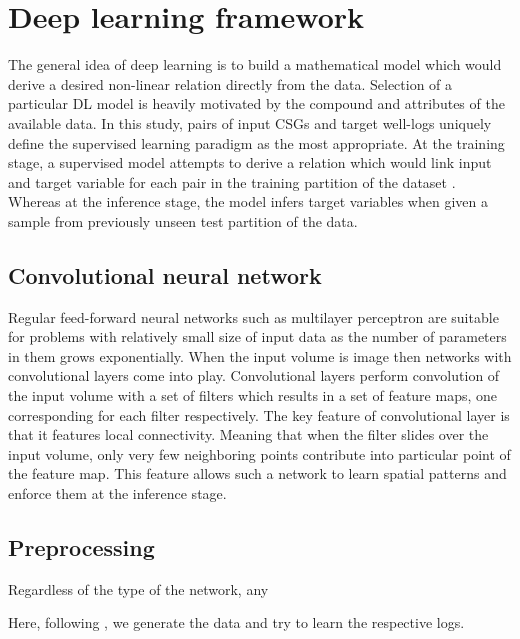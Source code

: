 \documentclass[manuscript]{geophysics}
\begin{document}
\section{Deep learning framework}
The general idea of deep learning is to build a mathematical model which would derive a desired non-linear relation directly from the data. Selection of a particular DL model is heavily motivated by the compound and attributes of the available data. 
In this study,  pairs of input CSGs and target well-logs  uniquely define the supervised learning paradigm as the most appropriate. At the training stage, a supervised model attempts to derive a relation which would link input and target variable for each pair in the training partition of the dataset . Whereas at the inference stage, the model infers target variables when given a sample from previously unseen test partition of the data.


\subsection{Convolutional neural network}
Regular feed-forward neural networks such as multilayer perceptron are suitable for problems with relatively small size of input data as the number of parameters in them grows exponentially. When the input volume is image then networks with convolutional layers come into play. Convolutional layers perform convolution of the input volume with a set of filters which results in a set of feature maps, one corresponding for each filter respectively. The key feature of convolutional layer is that it features local connectivity. Meaning that when the filter slides over the input volume, only very few neighboring points contribute into particular point of the feature map. This feature allows such a network to learn spatial patterns and enforce them at the inference stage.

\subsection{Preprocessing}
Regardless of the type of the network, any
%






Here, following \citep{york2019}, we generate the data and try to learn the respective logs.
\end{document}
